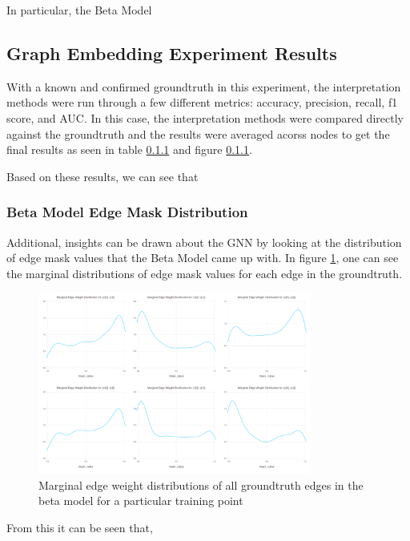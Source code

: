 In particular, the Beta Model 

\subsection{Graph Embedding Experiment Results}
With a known and confirmed groundtruth in this experiment, the interpretation methods were run through a few different metrics: accuracy, precision, recall, f1 score, and AUC. In this case, the interpretation methods were compared directly against the groundtruth and the results were averaged acorss nodes to get the final results as seen in table \ref{} and figure \ref{}.

Based on these results, we can see that 

\subsubsection{Beta Model Edge Mask Distribution}
Additional, insights can be drawn about the GNN by looking at the distribution of edge mask values that the Beta Model came up with. In figure \ref{fig:tree-model-beta-marginal}, one can see the marginal distributions of edge mask values for each edge in the groundtruth. 
\begin{figure}[H]
	\centering
	\includegraphics[width=0.8\textwidth]{images/tree-model-beta-marginal.pdf}
	\caption{Marginal edge weight distributions of all groundtruth edges in the beta model for a particular training point}
	\label{fig:tree-model-beta-marginal}
\end{figure}

From this it can be seen that, 

